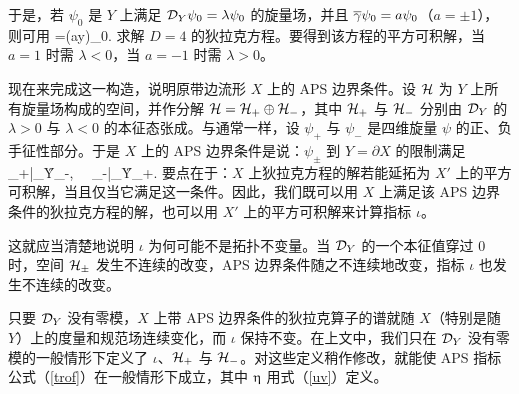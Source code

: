 
于是，若 $\psi_0$ 是 $Y$ 上满足 ${\mathcal D}_Y\psi_0=\lambda\psi_0$ 的旋量场，并且 ${\overline\gamma} \psi_0=a\psi_0$（$a=\pm 1$），则可用
\be\label{syw}\psi =\exp(a\lambda y)\psi_0.\ee
求解 $D=4$ 的狄拉克方程。要得到该方程的平方可积解，当 $a=1$ 时需 $\lambda<0$，当 $a=-1$ 时需 $\lambda>0$。

现在来完成这一构造，说明原带边流形 $X$ 上的 APS 边界条件。设 ${\mathcal H}$ 为 $Y$ 上所有旋量场构成的空间，并作分解 ${\mathcal H}={\mathcal H}_+\oplus {\mathcal H}_-$，其中 ${\mathcal H}_+$ 与 ${\mathcal H}_-$ 分别由 ${\mathcal D}_Y$ 的 $\lambda>0$ 与 $\lambda<0$ 的本征态张成。与通常一样，设 $\psi_+$ 与 $\psi_-$ 是四维旋量 $\psi$ 的正、负手征性部分。于是 $X$ 上的 APS 边界条件是说：$\psi_\pm$ 到 $Y=\partial X$ 的限制满足
\be\label{yw}\psi_+|_Y\in \H_-, ~~\psi_-|_Y\in\H_+. \ee
要点在于：$X$ 上狄拉克方程的解若能延拓为 $X'$ 上的平方可积解，当且仅当它满足这一条件。因此，我们既可以用 $X$ 上满足该 APS 边界条件的狄拉克方程的解，也可以用 $X'$ 上的平方可积解来计算指标 $\iota$。


这就应当清楚地说明 $\iota$ 为何可能不是拓扑不变量。当 ${\mathcal D}_Y$ 的一个本征值穿过 0 时，空间 ${\mathcal H}_\pm$ 发生不连续的改变，APS 边界条件随之不连续地改变，指标 $\iota$ 也发生不连续的改变。


只要 ${\mathcal D}_Y$ 没有零模，$X$ 上带 APS 边界条件的狄拉克算子的谱就随 $X$（特别是随 $Y$）上的度量和规范场连续变化，而 $\iota$ 保持不变。在上文中，我们只在 ${\mathcal D}_Y$ 没有零模的一般情形下定义了 $\iota$、${\mathcal H}_+$ 与 ${\mathcal H}_-$。对这些定义稍作修改，就能使 APS 指标公式（\ref{trof}）在一般情形下成立，其中 $\upeta$ 用式（\ref{uv}）定义。

